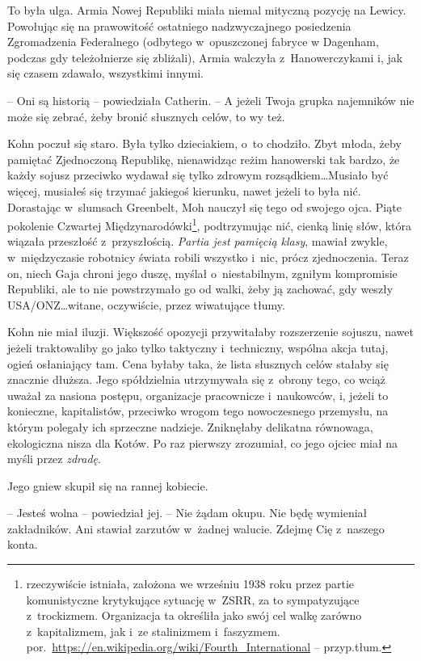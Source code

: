 \documentclass[oneside,polish,11pt,sfheadings]{mwbk}
\begin{document}
To była ulga. Armia Nowej Republiki miała niemal mityczną pozycję na
Lewicy. Powołując się na prawowitość ostatniego nadzwyczajnego posiedzenia Zgromadzenia Federalnego (od\-by\-tego w~o\-pusz\-czonej fabryce w Dagenham, podczas gdy teleżołnierze się zbliżali), Armia walczyła z~Hanowerczykami i, jak się czasem zdawało, wszystkimi innymi.

-- Oni są historią -- powiedziała Catherin. -- A jeżeli Twoja grupka
najemników nie może się zebrać, żeby bronić słusznych celów, to wy też.

Kohn poczuł się staro. Była tylko dzieciakiem, o~to chodziło. Zbyt
młoda, żeby pamiętać Zjednoczoną Republikę, nienawidząc reżim hanowerski
tak bardzo, że każdy sojusz przeciwko wydawał się tylko zdrowym
rozsądkiem\ldots Musiało być więcej, musiałeś się trzymać jakiegoś
kierunku, nawet jeżeli to była nić. Dorastając w~slumsach Greenbelt, Moh
nauczył się tego od swojego ojca. Piąte pokolenie Czwartej
Międzynarodówki\footnote{rzeczywiście istniała, założona we wrześniu 1938
roku przez partie komunistyczne krytykujące sytuację w~ZSRR, za to
sympatyzujące z~trockizmem. Organizacja ta określiła jako swój cel walkę
zarówno z~kapitalizmem, jak i~ze stalinizmem i~faszyzmem.
por.~\url{https://en.wikipedia.org/wiki/Fourth\_International}
-- przyp.tłum.}, podtrzymując nić, cienką linię słów, która wiązała
przeszłość z~przyszłością. \emph{Partia jest pamięcią klasy}, mawiał
zwykle, w~międzyczasie robotnicy świata robili wszystko i~nic, prócz
zjednoczenia. Teraz on, niech Gaja chroni jego duszę, myślał o~niestabilnym, zgniłym kompromisie Republiki, ale to nie powstrzymało go
od walki, żeby ją zachować, gdy weszły USA/ONZ\ldots witane, oczywiście,
przez wiwatujące tłumy.

Kohn nie miał iluzji. Większość opozycji przywitałaby rozszerzenie
sojuszu, nawet jeżeli traktowaliby go jako tylko taktyczny i~techniczny,
wspólna akcja tutaj, ogień osłaniający tam. Cena byłaby taka, że lista
słusznych celów stałaby się znacznie dłuższa. Jego spółdzielnia
utrzymywała się z~obrony tego, co wciąż uważał za nasiona postępu,
organizacje pracownicze i~naukowców, i, jeżeli to konieczne,
kapitalistów, przeciwko wrogom tego nowoczesnego przemysłu, na którym
polegały ich sprzeczne nadzieje. Zniknęłaby delikatna równowaga,
ekologiczna nisza dla Kotów. Po raz pierwszy zrozumiał, co jego ojciec
miał na myśli przez \emph{zdradę}.

Jego gniew skupił się na rannej kobiecie.

-- Jesteś wolna -- powiedział jej. -- Nie żądam okupu. Nie będę wymieniał
zakładników. Ani stawiał zarzutów w~żadnej walucie. Zdejmę Cię z~naszego
konta.
\end{document}
